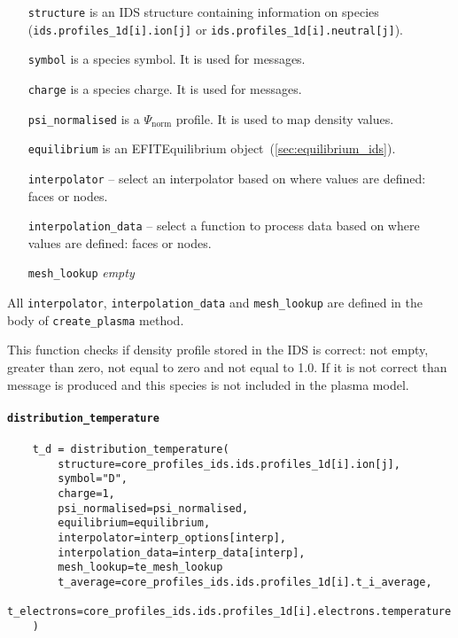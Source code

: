 \documentclass[../../main.tex]{subfiles}
\begin{document}
\begin{itemize}[align=left]
    \item[\texttt{structure}] is an IDS structure containing information on species (\texttt{ids.profiles\_1d[i].ion[j]} or \texttt{ids.profiles\_1d[i].neutral[j]}).
    \item[\texttt{symbol}] is a species symbol. It is used for messages.
    \item[\texttt{charge}] is a species charge. It is used for messages.
    \item[\texttt{psi\_normalised}] is a $\Psi_\text{norm}$ profile. It is used to map density values.
    \item[\texttt{equilibrium}] is an EFITEquilibrium object~(\cref{sec:equilibrium_ids}).
    \item[\texttt{interpolator}] -- select an interpolator based on where values are defined: faces or nodes.
    \item[\texttt{interpolation\_data}] -- select a function to process data based on where values are defined: faces or nodes.
    \item[\texttt{mesh\_lookup}] \emph{empty}
\end{itemize}

All \texttt{interpolator}, \texttt{interpolation\_data} and \texttt{mesh\_lookup} are defined in the body of \texttt{create\_plasma} method.

This function checks if density profile stored in the IDS is correct: not empty, greater than zero, not equal to zero and not equal to 1.0. If it is not correct than message is produced and this species is not included in the plasma model.

\paragraph{\texttt{distribution\_temperature}}%

\begin{verbatim}
    t_d = distribution_temperature(
        structure=core_profiles_ids.ids.profiles_1d[i].ion[j],
        symbol="D",
        charge=1,
        psi_normalised=psi_normalised,
        equilibrium=equilibrium,
        interpolator=interp_options[interp],
        interpolation_data=interp_data[interp],
        mesh_lookup=te_mesh_lookup
        t_average=core_profiles_ids.ids.profiles_1d[i].t_i_average,
        t_electrons=core_profiles_ids.ids.profiles_1d[i].electrons.temperature
    )
\end{verbatim}
\end{document}
